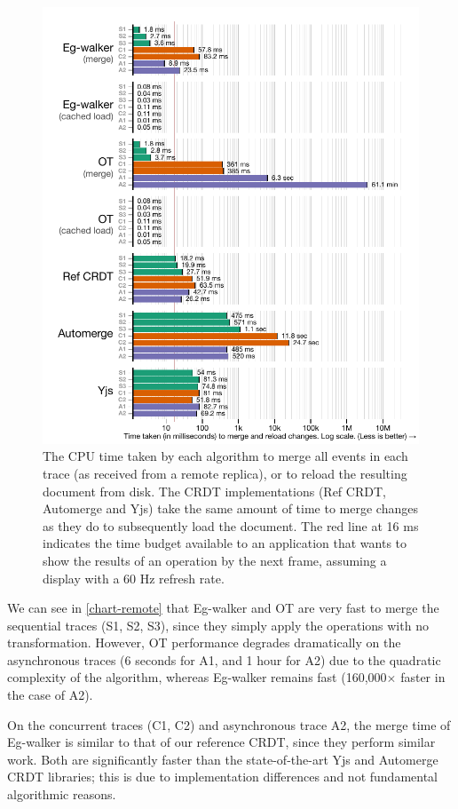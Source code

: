 \documentclass[sigplan,10pt]{acmart}
\newcommand{\algname}{Eg-walker\xspace}
\begin{document}
\begin{figure}
  \includegraphics[width=\linewidth]{diagrams/timings.pdf}
  \caption{The CPU time taken by each algorithm to merge all events in each trace (as received from a remote replica), or to reload the resulting document from disk. The CRDT implementations (Ref CRDT, Automerge and Yjs) take the same amount of time to merge changes as they do to subsequently load the document. The red line at 16 ms indicates the time budget available to an application that wants to show the results of an operation by the next frame, assuming a display with a 60 Hz refresh rate.}
  \label{chart-remote}
\end{figure}

We can see in \autoref{chart-remote} that \algname and OT are very fast to merge the sequential traces (S1, S2, S3), since they simply apply the operations with no transformation.
However, OT performance degrades dramatically on the asynchronous traces (6 seconds for A1, and 1 hour for A2) due to the quadratic complexity of the algorithm, whereas \algname remains fast (160,000$\times$ faster in the case of A2).

On the concurrent traces (C1, C2) and asynchronous trace A2, the merge time of \algname is similar to that of our reference CRDT, since they perform similar work.
Both are significantly faster than the state-of-the-art Yjs and Automerge CRDT libraries; this is due to implementation differences and not fundamental algorithmic reasons.
\end{document}

